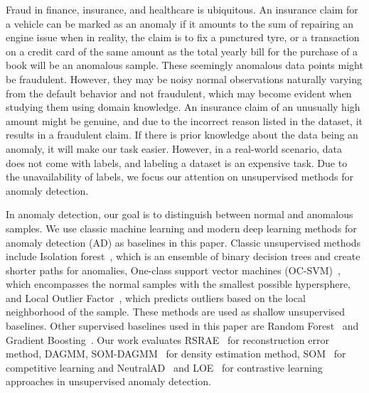 \documentclass{article}
\begin{document}
Fraud in finance, insurance, and healthcare is ubiquitous. An insurance claim for a vehicle can be marked as an anomaly if it amounts to the sum of repairing an engine issue when in reality, the claim is to fix a punctured tyre, or a transaction on a credit card of the same amount as the total yearly bill for the purchase of a book will be an anomalous sample. These seemingly anomalous data points might be fraudulent. However, they may be noisy normal observations naturally varying from the default behavior and not fraudulent, which may become evident when studying them using domain knowledge. An insurance claim of an unusually high amount might be genuine, and due to the incorrect reason listed in the dataset, it results in a fraudulent claim. If there is prior knowledge about the data being an anomaly, it will make our task easier. However, in a real-world scenario, data does not come with labels, and labeling a dataset is an expensive task. Due to the unavailability of labels, we focus our attention on unsupervised methods for anomaly detection. 

In anomaly detection, our goal is to distinguish between normal and anomalous samples. We use classic machine learning and modern deep learning methods for anomaly detection (AD) as baselines in this paper. Classic unsupervised methods include Isolation forest~\citep{isolationforest}, which is an ensemble of binary decision trees and create shorter paths for anomalies, One-class support vector machines (OC-SVM)~\citep{ocsvm}, which encompasses the normal samples with the smallest possible hypersphere, and Local Outlier Factor~\citep{lof}, which predicts outliers based on the local neighborhood of the sample. These methods are used as shallow unsupervised baselines. Other supervised baselines used in this paper are Random Forest~\citep{randomforest} and Gradient Boosting~\citep{gradientboosting}. Our work evaluates RSRAE~\citep{rsrae} for reconstruction error method, DAGMM, SOM-DAGMM~\citep{dagmm, som} for density estimation method, SOM~\citep{kohonen1990self} for competitive learning and NeutralAD~\citep{qiu2021neural} and LOE~\citep{qiu2022latent} for contrastive learning approaches in unsupervised anomaly detection.
\end{document}
